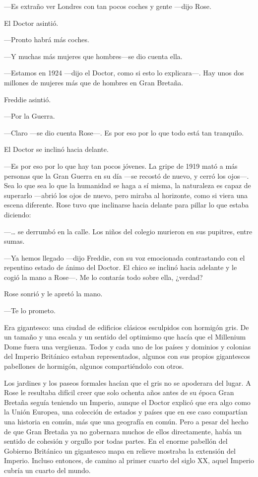 {---Es extraño ver Londres con tan pocos coches y gente ---dijo Rose.}

{El Doctor asintió.}

{---Pronto habrá más coches.}

{---Y muchas más mujeres que hombres---se dio cuenta ella.}

{---Estamos en 1924 ---dijo el Doctor, como si esto lo explicara---. Hay
unos dos millones de mujeres más que de hombres en Gran Bretaña.}

{Freddie asintió.}

{---Por la Guerra.}

{---Claro ---se dio cuenta Rose---. Es por eso por lo que todo está tan
tranquilo.}

{El Doctor se inclinó hacia delante.}

{---Es por eso por lo que hay tan pocos jóvenes. La gripe de 1919 mató a
	más personas que la Gran Guerra en su día ---se recostó de nuevo, y
	cerró los ojos---. Sea lo que sea lo que la humanidad se haga a sí
	misma, la naturaleza es capaz de superarlo ---abrió los ojos de nuevo,
	pero miraba al horizonte, como si viera una escena diferente. Rose tuvo
que inclinarse hacia delante para pillar lo que estaba diciendo:}

{---\ldots{} se derrumbó en la calle. Los niños del colegio murieron en
sus pupitres, entre sumas.}

{---Ya hemos llegado ---dijo Freddie, con su voz emocionada contrastando
	con el repentino estado de ánimo del Doctor. El chico se inclinó hacia
	adelante y le cogió la mano a Rose---. Me lo contarás todo sobre ella,
¿verdad?}

{Rose sonrió y le apretó la mano.}

{---Te lo prometo.}

{Era gigantesco: una ciudad de edificios clásicos esculpidos con
	hormigón gris. De un tamaño y una escala y un sentido del optimismo que
	hacía que el Millenium Dome fuera una vergüenza. Todos y cada uno de los
	países y dominios y colonias del Imperio Británico estaban
	representados, algunos con sus propios gigantescos pabellones de
hormigón, algunos compartiéndolo con otros.}

{Los jardines y los paseos formales hacían que el gris no se apoderara
	del lugar. A Rose le resultaba difícil creer que solo ochenta años antes
	de su época Gran Bretaña seguía teniendo un Imperio, aunque el Doctor
	explicó que era algo como la Unión Europea, una colección de estados y
	países que en ese caso compartían una historia en común, más que una
	geografía en común. Pero a pesar del hecho de que Gran Bretaña ya no
	gobernara muchos de ellos directamente, había un sentido de cohesión y
	orgullo por todas partes. En el enorme pabellón del Gobierno Británico
	un gigantesco mapa en relieve mostraba la extensión del Imperio. Incluso
	entonces, de camino al primer cuarto del siglo XX, aquel Imperio cubría
un cuarto del mundo.}

